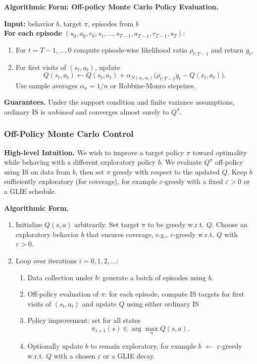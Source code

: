 \documentclass[
]{book}
\providecommand{\tightlist}{%
  \setlength{\itemsep}{0pt}\setlength{\parskip}{0pt}}
\theoremstyle{definition}
\theoremstyle{definition}
\theoremstyle{definition}
\theoremstyle{definition}
\theoremstyle{remark}
\begin{document}
\textbf{Algorithmic Form: Off-policy Monte Carlo Policy Evaluation.}

\textbf{Input:} behavior \(b\), target \(\pi\), episodes from \(b\)\\
\textbf{For each episode} \((s_0,a_0,r_0,s_1,\dots,s_{T-1},a_{T-1},r_{T-1},s_T)\):

\begin{enumerate}
\def\labelenumi{\arabic{enumi}.}
\item
  For \(t=T-1,\dots,0\) compute episode-wise likelihood ratio \(\rho_{t:T-1}\) and return \(g_t\),
\item
  For first visits of \((s_t,a_t)\), update
  \[
  Q(s_t,a_t) \leftarrow Q(s_t,a_t) + \alpha_{N(s_t,a_t)}\big(\rho_{t:T-1} g_t - Q(s_t,a_t)\big).
  \]
  Use sample averages \(\alpha_n=1/n\) or Robbins-Monro stepsizes.
\end{enumerate}

\textbf{Guarantees.} Under the support condition and finite variance assumptions, ordinary IS is \emph{unbiased} and converges almost surely to \(Q^\pi\).

\subsubsection{Off-Policy Monte Carlo Control}\label{off-policy-monte-carlo-control}

\textbf{High-level Intuition.} We wish to improve a target policy \(\pi\) toward optimality while behaving with a different exploratory policy \(b\). We evaluate \(Q^\pi\) off-policy using IS on data from \(b\), then set \(\pi\) greedy with respect to the updated \(Q\). Keep \(b\) sufficiently exploratory (for coverage), for example \(\varepsilon\)-greedy with a fixed \(\varepsilon>0\) or a GLIE schedule.

\textbf{Algorithmic Form.}

\begin{enumerate}
\def\labelenumi{\arabic{enumi}.}
\item
  Initialize \(Q(s,a)\) arbitrarily. Set target \(\pi\) to be greedy w.r.t. \(Q\). Choose an exploratory behavior \(b\) that ensures coverage, e.g., \(\varepsilon\)-greedy w.r.t. \(Q\) with \(\varepsilon>0\).
\item
  Loop over iterations \(i=0,1,2,\dots\):

  \begin{enumerate}
  \def\labelenumii{\arabic{enumii}.}
  \tightlist
  \item
    Data collection under \(b\): generate a batch of episodes using \(b\).
  \item
    Off-policy evaluation of \(\pi\): for each episode, compute IS targets for first visits of \((s_t,a_t)\) and update \(Q\) using either ordinary IS
  \item
    Policy improvement: set for all states
    \[
    \pi_{i+1}(s) \in \arg\max_{a} Q(s,a).
    \]
  \item
    Optionally update \(b\) to remain exploratory, for example \(b\) \(\leftarrow\) \(\varepsilon\)-greedy w.r.t. \(Q\) with a chosen \(\varepsilon\) or a GLIE decay.
  \end{enumerate}
\end{enumerate}
\end{document}
